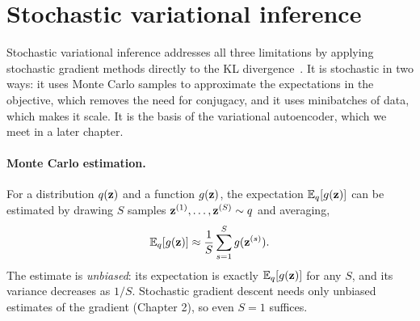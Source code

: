 \section{Stochastic variational inference}
\label{sec:svi}

Stochastic variational inference addresses all three limitations by applying stochastic gradient methods directly to the KL divergence~\citep{nott2012,paisley2012,salimans2013,hoffman2013,ranganath2014}. It is stochastic in two ways: it uses Monte Carlo samples to approximate the expectations in the objective, which removes the need for conjugacy, and it uses minibatches of data, which makes it scale. It is the basis of the variational autoencoder, which we meet in a later chapter.

\paragraph{Monte Carlo estimation.} For a distribution $q(\mathbf{z})$ and a function $g(\mathbf{z})$, the expectation $\mathbb{E}_q[g(\mathbf{z})]$ can be estimated by drawing $S$ samples $\mathbf{z}^{(1)},\dots,\mathbf{z}^{(S)}\sim q$ and averaging,
\begin{equation}
  \mathbb{E}_q[g(\mathbf{z})] \approx \frac{1}{S}\sum_{s=1}^S g(\mathbf{z}^{(s)}).
\end{equation}
The estimate is \emph{unbiased}: its expectation is exactly $\mathbb{E}_q[g(\mathbf{z})]$ for any $S$, and its variance decreases as $1/S$. Stochastic gradient descent needs only unbiased estimates of the gradient (Chapter 2), so even $S=1$ suffices.

